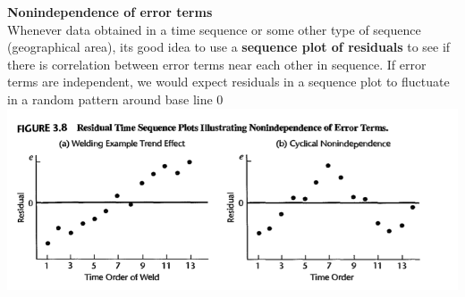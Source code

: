 \documentclass[11pt]{article}
\begin{document}
\begin{defn*}
    \textbf{Nonindependence of error terms} \\
    Whenever data obtained in a time sequence or some other type of sequence (geographical area), its good idea to use a \textbf{sequence plot of residuals} to see if there is correlation between error terms near each other in sequence. If error terms are independent, we would expect residuals in a sequence plot to fluctuate in a random pattern around base line 0\\
    \includegraphics[width=\textwidth]{nonnidependence_plot.png}
\end{defn*}
\end{document}
